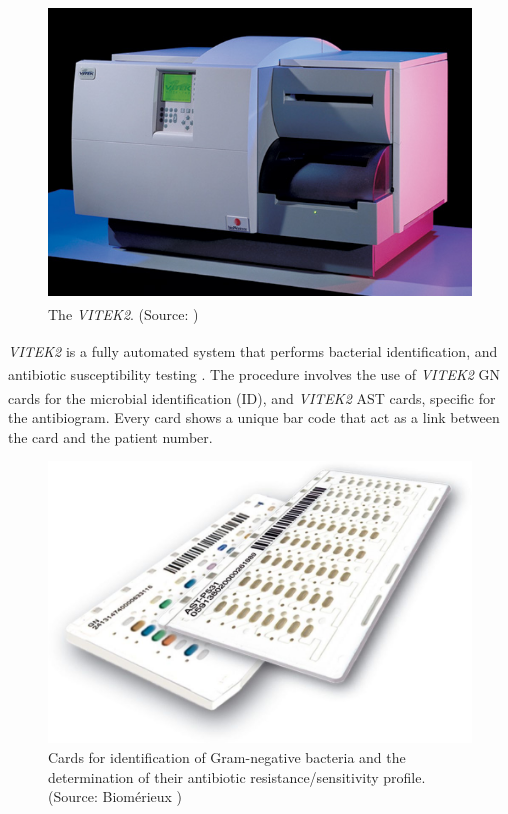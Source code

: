 \documentclass[11pt]{report}
\begin{document}
\begin{figure}[htp]
\centering
\includegraphics[scale=0.500]{img/vitek2img.jpg}
\caption{The \emph{VITEK}\textsuperscript{\textregistered}\emph{2}. (Source: \cite{vitek2img})}
\label{vitek2}
\end{figure}

\emph{VITEK}\textsuperscript{\textregistered}\emph{2} is a fully automated system that performs bacterial identification, and antibiotic susceptibility testing \cite{vitek2}.
The procedure involves the use of \emph{VITEK}\textsuperscript{\textregistered}\emph{2} GN cards for the microbial identification (ID), and \emph{VITEK}\textsuperscript{\textregistered}\emph{2} AST cards, specific for the antibiogram.
Every card shows a unique bar code that act as a link between the card and the patient number.

\begin{figure}[htp]
\centering
\includegraphics[scale=0.20]{img/vitekCards.jpg}
\caption{Cards for identification of Gram-negative bacteria and the determination of their antibiotic resistance/sensitivity profile. (Source: Biomérieux \cite{vitekCards})}
\label{vitekCards}
\end{figure}
\end{document}
